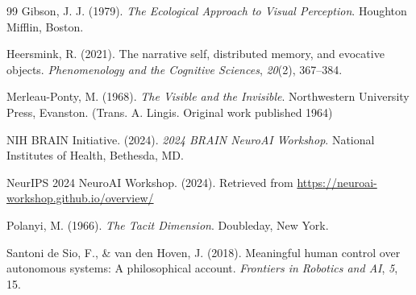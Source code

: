 \documentclass[12pt]{article}
\begin{document}
\begin{thebibliography}{99}
Gibson, J. J. (1979). \textit{The Ecological Approach to Visual Perception}. Houghton Mifflin, Boston.

Heersmink, R. (2021). The narrative self, distributed memory, and evocative objects. \textit{Phenomenology and the Cognitive Sciences}, \textit{20}(2), 367--384.

Merleau-Ponty, M. (1968). \textit{The Visible and the Invisible}. Northwestern University Press, Evanston. (Trans. A. Lingis. Original work published 1964)

NIH BRAIN Initiative. (2024). \textit{2024 BRAIN NeuroAI Workshop}. National Institutes of Health, Bethesda, MD.

NeurIPS 2024 NeuroAI Workshop. (2024). Retrieved from \url{https://neuroai-workshop.github.io/overview/}

Polanyi, M. (1966). \textit{The Tacit Dimension}. Doubleday, New York.

Santoni de Sio, F., \& van den Hoven, J. (2018). Meaningful human control over autonomous systems: A philosophical account. \textit{Frontiers in Robotics and AI}, \textit{5}, 15.

\end{thebibliography}
\end{document}
